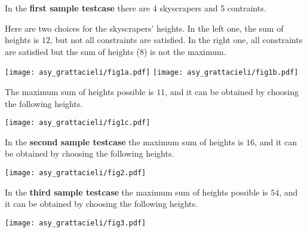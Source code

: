 

\Examples

\begin{example}
%
%
\end{example}

\begin{example}
%
\end{example}



\Explanation

In the \textbf{first sample testcase} there are 4 skyscrapers and 5 contraints.

Here are two choices for the skyscrapers' heights.
In the left one, the sum of heights is $12$, but not all constraints are satisfied.
In the right one, all constraints are satisfied but the sum of heights ($8$) is not the maximum.

\begin{center}
\hfill
\texttt{[image: asy\_grattacieli/fig1a.pdf]}
\hfill
\texttt{[image: asy\_grattacieli/fig1b.pdf]}
\hfill
\phantom{}
\end{center}

The maximum sum of heights possible is
$11$,
and it can be obtained by choosing the following heights.

\begin{center}
\texttt{[image: asy\_grattacieli/fig1c.pdf]}
\end{center}

In the \textbf{second sample testcase} the maximum sum of heights is
$16$,
and it can be obtained by choosing the following heights.

\begin{center}
\texttt{[image: asy\_grattacieli/fig2.pdf]}
\end{center}

In the \textbf{third sample testcase} the maximum sum of heights possible is
$54$,
and it can be obtained by choosing the following heights.

\begin{center}
\texttt{[image: asy\_grattacieli/fig3.pdf]}
\end{center}
